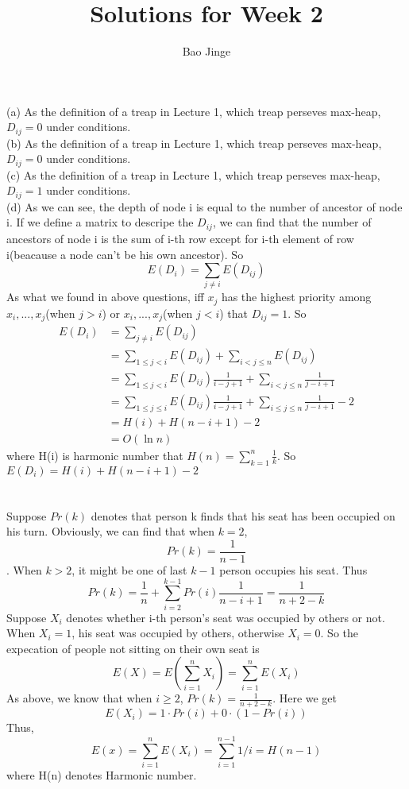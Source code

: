 \documentclass{article}
\author{Bao Jinge}
\title{Solutions for Week 2}
\date{}
\begin{document}
	\maketitle
	\section{}
	(a) As the definition of a treap in Lecture 1, which treap perseves max-heap, $D_{ij}=0$ under conditions.\\
	(b) As the definition of a treap in Lecture 1, which treap perseves max-heap, $D_{ij}=0$ under conditions.\\
	(c) As the definition of a treap in Lecture 1, which treap perseves max-heap, $D_{ij}=1$ under conditions.\\
	(d) As we can see, the depth of node i is equal to the number of ancestor of node i. If we define a matrix to descripe the $D_{ij}$, we can find that the number of ancestors of node i is the sum of i-th row except for i-th element of row i(beacause a node can't be his own ancestor).
	So $$E(D_i)=\sum_{j\not=i}{E(D_{ij})}$$
	As what we found in above questions, iff $x_j$ has the highest priority among ${x_i,...,x_j}$(when $j>i$) or ${x_i,...,x_j}$(when $j<i$) that $D_{ij}=1$.
	So 
	\begin{equation}
	\begin{aligned}
		E(D_i)&=\sum_{j\not=i}{E(D_{ij})} \\
		&=\sum_{1\leq j<i}{E(D_{ij})}+\sum_{i< j \leq n}{E(D_{ij})} \\
		&=\sum_{1\leq j<i}{E(D_{ij})}{\frac{1}{i-j+1}}+\sum_{i< j \leq n}{\frac{1}{j-i+1}} \\
		&=\sum_{1\leq j\leq i}{E(D_{ij})}{\frac{1}{i-j+1}}+\sum_{i \leq j \leq n}{\frac{1}{j-i+1}} - 2 \\
		&=H(i)+H(n-i+1)-2 \\
		&=O(\ln{n})
	\end{aligned}
	\end{equation} 
	where H(i) is harmonic number that $H(n)=\sum_{k=1}^{n}{\frac{1}{k}}$.
	So $E(D_i)=H(i)+H(n-i+1)-2$


	\section{}
	Suppose $Pr(k)$ denotes that person k finds that his seat has been occupied on his turn. Obviously, we can find that when $k=2$, 
	$$Pr(k)=\frac{1}{n-1}$$.
	When $k>2$, it might be one of last $k-1$ person occupies his seat. Thus
	$$Pr(k)=\frac{1}{n}+\sum^{k-1}_{i=2}{Pr(i)\frac{1}{n-i+1}}=\frac{1}{n+2-k}$$
	Suppose $X_i$ denotes whether i-th person's seat was occupied by others or not. 
	When $X_i=1$, his seat was occupied by others, otherwise $X_i=0$.
	So the expecation of people not sitting on their own seat is
	$$E(X)=E(\sum_{i=1}^{n}{X_i})=\sum_{i=1}^{n}{E(X_i)}$$
	As above, we know that when $i \geq 2$, $Pr(k)=\frac{1}{n+2-k}$. 
	Here we get $$E(X_i)=1 \cdot Pr(i)+0 \cdot (1-Pr(i))$$
	Thus, 
	$$E(x)=\sum_{i=1}^{n}{E(X_i)}=\sum_{i=1}^{n-1}{1/i}=H(n-1)$$
	where H(n) denotes Harmonic number.
\end{document}
